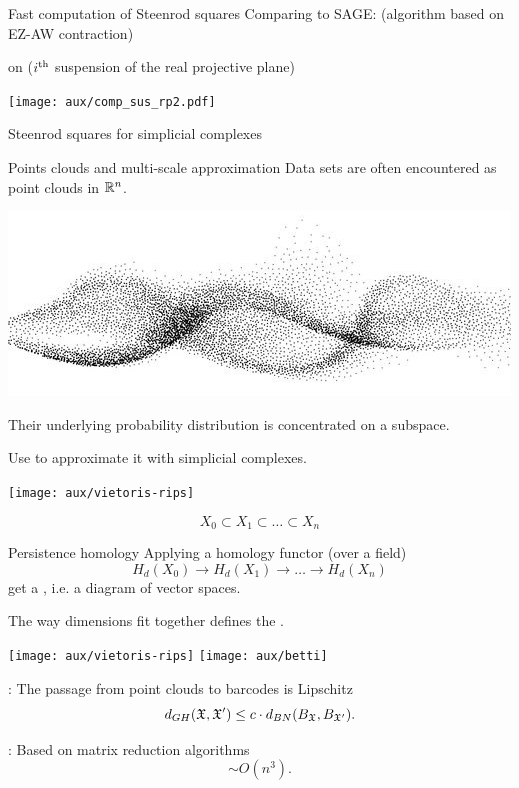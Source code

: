 \begin{frame}{Fast computation of Steenrod squares}
	\pause
	Comparing to SAGE: (algorithm based on EZ-AW contraction)

	\smallskip\pause
	 on  ($i^{\mathrm{th}}$ suspension of the real projective plane)

	\medskip
	\texttt{[image: aux/comp\_sus\_rp2.pdf]}
\end{frame}

\begin{frame}{Steenrod squares for simplicial complexes}
	
\end{frame}

\begin{frame}{Points clouds and multi-scale approximation}
	\pause
	Data sets are often encountered as point clouds in $\mathbb{R}^n$.

	\pause
	\begin{center}
		\includegraphics[scale=.4]{aux/point_cloud_cropped}
	\end{center}

	\pause
	Their underlying probability distribution is concentrated on a subspace.

	\medskip\pause
	Use  to approximate it with simplicial complexes.
	\medskip
	\begin{center}
		\texttt{[image: aux/vietoris-rips]}
	\end{center}

	\vskip-15pt
	\[
	X_{0} \subset X_{1} \subset\dots\subset X_{n}
	\]
\end{frame}

\begin{frame}{Persistence homology}
	\pause
	Applying a homology functor (over a field)
	\[
	H_d(X_0) \to H_d(X_1) \to\dots\to H_d(X_n)
	\]
	get a , i.e. a diagram of vector spaces.

	\pause\bigskip
	The way dimensions fit together defines the .
	\begin{center}
		\texttt{[image: aux/vietoris-rips]}
		\texttt{[image: aux/betti]}
	\end{center}

	\pause\smallskip
	: The passage from point clouds to barcodes is Lipschitz
	\[
	d_{GH}(\mathfrak{X}, \mathfrak{X}') \leq c \cdot d_{BN}(B_{\mathfrak{X}}, B_{\mathfrak{X}'}).
	\]

	\pause
	: Based on matrix reduction algorithms
	\[
	\sim O(n^3).
	\]
\end{frame}

